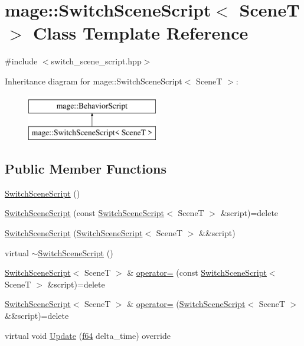 \hypertarget{classmage_1_1_switch_scene_script}{}\section{mage\+:\+:Switch\+Scene\+Script$<$ SceneT $>$ Class Template Reference}
\label{classmage_1_1_switch_scene_script}


{\ttfamily \#include $<$switch\+\_\+scene\+\_\+script.\+hpp$>$}

Inheritance diagram for mage\+:\+:Switch\+Scene\+Script$<$ SceneT $>$\+:\begin{figure}[H]
\begin{center}
\leavevmode
\includegraphics[height=2.000000cm]{classmage_1_1_switch_scene_script}
\end{center}
\end{figure}
\subsection*{Public Member Functions}
\begin{DoxyCompactItemize}
\item 
\hyperlink{classmage_1_1_switch_scene_script_aefd104d1ddabdd4709c8682e89c79655}{Switch\+Scene\+Script} ()
\item 
\hyperlink{classmage_1_1_switch_scene_script_a307db08624888173ab256b387f07f1c4}{Switch\+Scene\+Script} (const \hyperlink{classmage_1_1_switch_scene_script}{Switch\+Scene\+Script}$<$ SceneT $>$ \&script)=delete
\item 
\hyperlink{classmage_1_1_switch_scene_script_a6803282c82656616ac7459b34e85fdc7}{Switch\+Scene\+Script} (\hyperlink{classmage_1_1_switch_scene_script}{Switch\+Scene\+Script}$<$ SceneT $>$ \&\&script)
\item 
virtual \hyperlink{classmage_1_1_switch_scene_script_a9c5907dfea7512a934e37136a9e3970b}{$\sim$\+Switch\+Scene\+Script} ()
\item 
\hyperlink{classmage_1_1_switch_scene_script}{Switch\+Scene\+Script}$<$ SceneT $>$ \& \hyperlink{classmage_1_1_switch_scene_script_afa17a58d641d05ac406fecb43c84ec2b}{operator=} (const \hyperlink{classmage_1_1_switch_scene_script}{Switch\+Scene\+Script}$<$ SceneT $>$ \&script)=delete
\item 
\hyperlink{classmage_1_1_switch_scene_script}{Switch\+Scene\+Script}$<$ SceneT $>$ \& \hyperlink{classmage_1_1_switch_scene_script_a9f78862b9432a35e9bd606e0be43966a}{operator=} (\hyperlink{classmage_1_1_switch_scene_script}{Switch\+Scene\+Script}$<$ SceneT $>$ \&\&script)=delete
\item 
virtual void \hyperlink{classmage_1_1_switch_scene_script_a33b526d1543916b586268656c2c06022}{Update} (\hyperlink{namespacemage_ab935747c6941320bd6214b5a5f265b09}{f64} delta\+\_\+time) override
\end{DoxyCompactItemize}
